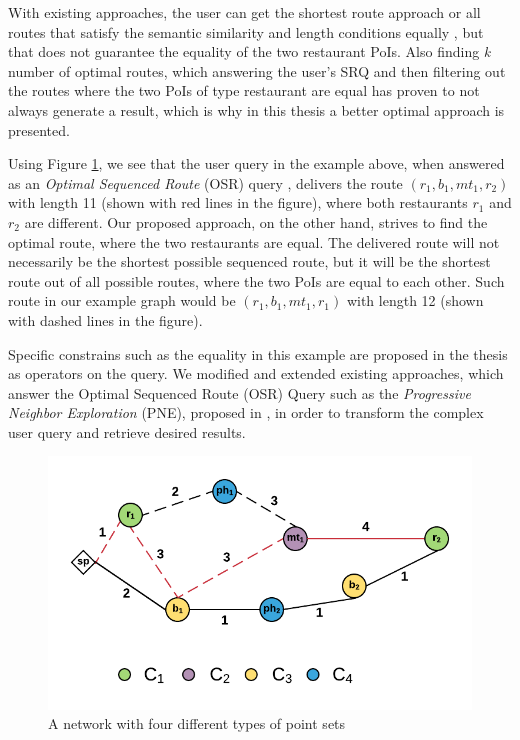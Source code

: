 With existing approaches, the user can get the shortest route \cite{OSR} approach or all routes that satisfy the semantic similarity and length conditions equally \cite{semanticSRQ}, but that does not guarantee the equality of the two restaurant PoIs. Also finding \textit{k} number of optimal routes, which answering the user's SRQ and then filtering out the routes where the two PoIs of type restaurant are equal has proven to not always generate a result, which is why in this thesis a better optimal approach is presented.

\enlargethispage*{30pt}

Using Figure \ref{fig:example}, we see that the user query in the example above, when answered as an \textit{Optimal Sequenced Route} (OSR) query \cite{OSR}, delivers the route $(r_1, b_1, mt_1, r_2)$ with length 11 (shown with red lines in the figure), where both restaurants $r_1$ and $r_2$ are different. Our proposed approach, on the other hand, strives to find the optimal route, where the two restaurants are equal. The delivered route will not necessarily be the shortest possible sequenced route, but it will be the shortest route out of all possible routes, where the two PoIs are equal to each other. Such route in our example graph would be $(r_1, b_1, mt_1, r_1)$ with length 12 (shown with dashed lines in the figure).

Specific constrains such as the equality in this example are proposed in the thesis as operators on the query. We modified and extended existing approaches, which answer the Optimal Sequenced Route (OSR) Query such as the \textit{Progressive Neighbor Exploration} (PNE), proposed in \cite{OSR}, in order to transform the complex user query and retrieve desired results.

\begin{figure}[H]
	\includegraphics[scale=1]{images/Example_routes.png}
	\centering
	\caption{A network with four different types of point sets}
	\label{fig:example}
\end{figure}

